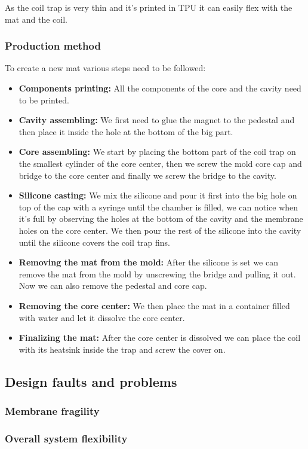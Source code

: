As the coil trap is very thin and it's printed in TPU it can easily flex with the mat and the coil.

\subsubsection{Production method}
To create a new mat various steps need to be followed:
\begin{itemize}
    \item \textbf{Components printing: } All the components of the core and the cavity need to be printed.
    \item \textbf{Cavity assembling: } We first need to glue the magnet to the pedestal and then place it inside the hole at the bottom of the big part.
    \item \textbf{Core assembling: } We start by placing the bottom part of the coil trap on the smallest cylinder of the core center, then we screw the mold core cap and bridge to the core center and finally we screw the bridge to the cavity.
    \item \textbf{Silicone casting: } We mix the silicone and pour it first into the big hole on top of the cap with a syringe until the chamber is filled, we can notice when it's full by observing the holes at the bottom of the cavity and the membrane holes on the core center.
    We then pour the rest of the silicone into the cavity until the silicone covers the coil trap fins.
    \item \textbf{Removing the mat from the mold: } After the silicone is set we can remove the mat from the mold by unscrewing the bridge and pulling it out.
    Now we can also remove the pedestal and core cap.
    \item \textbf{Removing the core center: } We then place the mat in a container filled with water and let it dissolve the core center.
    \item \textbf{Finalizing the mat: } After the core center is dissolved we can place the coil with its heatsink inside the trap and screw the cover on.
\end{itemize}

\subsection{Design faults and problems}



\subsubsection{Membrane fragility}

\subsubsection{Overall system flexibility}

